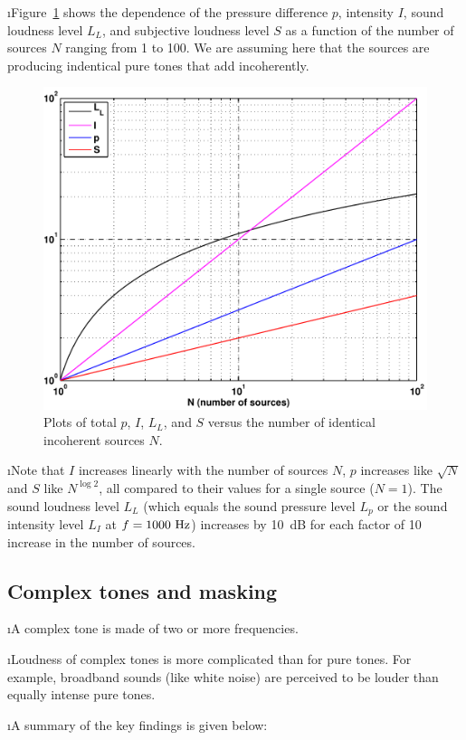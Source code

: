 \i Figure~\ref{f:multiplesources} shows the dependence
of the pressure difference $p$, intensity $I$,
sound loudness level $L_L$, and subjective loudness level
$S$ as a function of the number of sources $N$ ranging
from 1 to 100.
We are assuming here that the sources are producing
indentical pure tones that add incoherently.
%
\begin{figure}[htbp]
\begin{center}
\includegraphics[width=.6\textwidth]{multiplesources}
\caption{Plots of total $p$, $I$, $L_L$, and $S$ 
versus the number of identical incoherent sources $N$.}
\label{f:multiplesources}
\end{center}
\end{figure}
%

\i Note that $I$ increases linearly with the number of
sources $N$, $p$ increases like $\sqrt{N}$ and 
$S$ like $N^{\log 2}$, all compared to their values 
for a single source ($N=1$).
The sound loudness level $L_L$ (which equals the sound
pressure level $L_p$ or the sound intensity level $L_I$
at $f=1000~{\rm Hz}$) increases by 10~dB for each factor
of 10 increase in the number of sources.

\ei

\subsection{Complex tones and masking}
\bi

\i A complex tone is made of two or more frequencies.

\i Loudness of complex tones is more complicated than
for pure tones.
For example, broadband sounds (like white noise) are perceived
to be louder than equally intense pure tones.

\i A summary of the key findings is given below:

